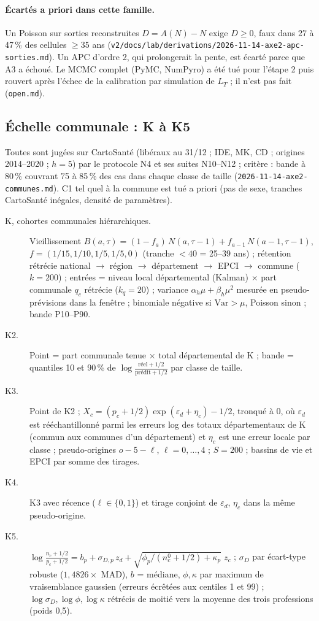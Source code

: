 \paragraph{Écartés a priori dans cette famille.} Un Poisson sur sorties reconstruites $D = A(N) - N$ exige
$D \ge 0$, faux dans 27 à 47\,\%\mesure{} des cellules $\ge 35$ ans
(\texttt{v2/docs/lab/derivations/2026-11-14-axe2-apc-sorties.md}). Un APC d'ordre 2, qui prolongerait la
pente, est écarté parce que A3 a échoué. Le MCMC complet (PyMC, NumPyro) a été tué pour l'étape 2 puis
rouvert après l'échec de la calibration par simulation de $L_T$ ; il n'est pas fait (\texttt{open.md}).

\subsection{Échelle communale : K à K5}
\label{met:communes}
Toutes sont jugées sur CartoSanté (libéraux au 31/12 ; IDE, MK, CD ; origines 2014--2020 ; $h = 5$) par le
protocole N4 et ses suites N10--N12 ; critère : bande à 80\,\% couvrant 75 à 85\,\% des cas dans chaque
classe de taille (\texttt{2026-11-14-axe2-communes.md}). C1 tel quel à la commune est tué a priori (pas de
sexe, tranches CartoSanté inégales, densité de paramètres).
\begin{description}
  \item[K, cohortes communales hiérarchiques.] Vieillissement
    $B(a,\tau) = (1 - f_a)\,N(a,\tau-1) + f_{a-1}\,N(a-1,\tau-1)$,
    $f = (1/15, 1/10, 1/5, 1/5, 0)$ (tranche $<40$ = 25--39 ans\suppose) ; rétention rétrécie
    national $\to$ région $\to$ département $\to$ EPCI $\to$ commune ($k = 200$\suppose) ; entrées = niveau
    local départemental (Kalman) $\times$ part communale $q_c$ rétrécie ($k_q = 20$\suppose) ; variance
    $\alpha_h\mu + \beta_h\mu^2$ mesurée en pseudo-prévisions dans la fenêtre ; binomiale négative si
    $\mathrm{Var} > \mu$, Poisson sinon ; bande P10--P90.
  \item[K2.] Point = part communale tenue $\times$ total départemental de K ; bande = quantiles 10 et 90\,\%
    de $\log\frac{\text{réel}+1/2}{\text{prédit}+1/2}$ par classe de taille.
  \item[K3.] Point de K2 ; $X_c = (p_c + 1/2)\exp(\varepsilon_d + \eta_c) - 1/2$, tronqué à 0, où
    $\varepsilon_d$ est rééchantillonné parmi les erreurs log des totaux départementaux de K (commun aux
    communes d'un département) et $\eta_c$ est une erreur locale par classe ; pseudo-origines
    $o - 5 - \ell$, $\ell = 0,\dots,4$ ; $S = 200$ ; bassins de vie et EPCI par somme des tirages.
  \item[K4.] K3 avec récence ($\ell \in \{0, 1\}$) et tirage conjoint de $\varepsilon_d$, $\eta_c$ dans la
    même pseudo-origine.
  \item[K5.] $\log\frac{n_c + 1/2}{p_c + 1/2} = b_p + \sigma_{D,p}\,z_d + \sqrt{\phi_p/(n^0_c + 1/2) + \kappa_p}\;z_c$ ;
    $\sigma_D$ par écart-type robuste ($1{,}4826\times$ MAD), $b$ = médiane, $\phi, \kappa$ par maximum de
    vraisemblance gaussien (erreurs écrêtées aux centiles 1 et 99) ; $\log\sigma_D, \log\phi, \log\kappa$
    rétrécis de moitié vers la moyenne des trois professions (poids 0,5\suppose).
\end{description}


